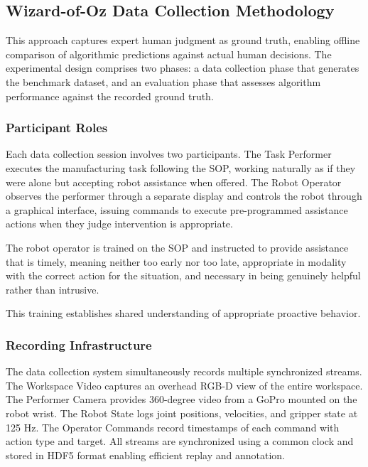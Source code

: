 \subsection{Wizard-of-Oz Data Collection Methodology}

This approach captures expert human judgment as ground truth, enabling offline comparison of algorithmic predictions against actual human decisions. The experimental design comprises two phases: a data collection phase that generates the benchmark dataset, and an evaluation phase that assesses algorithm performance against the recorded ground truth.

\subsubsection{Participant Roles}

Each data collection session involves two participants. The Task Performer executes the manufacturing task following the SOP, working naturally as if they were alone but accepting robot assistance when offered. The Robot Operator observes the performer through a separate display and controls the robot through a graphical interface, issuing commands to execute pre-programmed assistance actions when they judge intervention is appropriate.

The robot operator is trained on the SOP and instructed to provide assistance that is timely, meaning neither too early nor too late, appropriate in modality with the correct action for the situation, and necessary in being genuinely helpful rather than intrusive.

This training establishes shared understanding of appropriate proactive behavior.

\subsubsection{Recording Infrastructure}

The data collection system simultaneously records multiple synchronized streams. The Workspace Video captures an overhead RGB-D view of the entire workspace. The Performer Camera provides 360-degree video from a GoPro mounted on the robot wrist. The Robot State logs joint positions, velocities, and gripper state at 125 Hz. The Operator Commands record timestamps of each command with action type and target. All streams are synchronized using a common clock and stored in HDF5 format enabling efficient replay and annotation.

